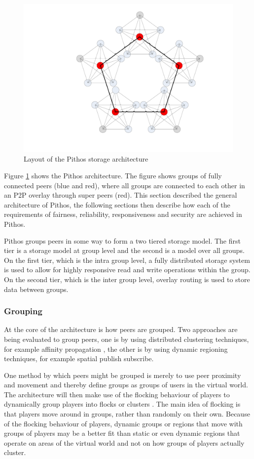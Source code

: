 \documentclass[10pt,a4paper,conference]{IEEEtran}
\begin{document}
\begin{figure}[htbp]
 \centering
 \includegraphics[clip=true, viewport=7.5cm 2.5cm 26cm 20cm, width=0.7\columnwidth]{CDHT_layout}
 \caption{Layout of the Pithos storage architecture}
 \label{fig_pithos}
\end{figure}
%
Figure \ref{fig_pithos} shows the Pithos architecture. The figure shows groups of fully connected peers (blue and red), where all groups are
connected to each other in an P2P overlay through super peers (red). This section described the general architecture of Pithos, the following
sections then describe how each of the requirements of fairness, reliability, responsiveness and security are achieved in Pithos.

Pithos groups peers in some way to form a two tiered storage model. The first tier is a storage model at group level and the second is a model over
all groups. On the first tier, which is the intra group level, a fully distributed storage system is used to allow for highly responsive read and
write operations within the group. On the second tier, which is the inter group level, overlay routing is used to store data between groups.

\subsubsection{Grouping}

At the core of the architecture is how peers are grouped. Two approaches are being evaluated to group peers, one is by using distributed clustering
techniques, for example affinity propagation \cite{affinity_propagation}, the other is by using dynamic regioning techniques, for example spatial
publish subscribe.

One method by which peers might be grouped is merely to use peer proximity and movement and thereby define groups as groups of users in the virtual
world. The architecture will then make use of the flocking behaviour of players to dynamically group players into flocks or clusters \cite{flocking}.
The main idea of flocking is that players move around in groups, rather than randomly on their own. Because of the flocking behaviour of players,
dynamic groups or regions that move with groups of players may be a better fit than static or even dynamic regions that operate on areas of the
virtual world and not on how groups of players actually cluster.
\end{document}
